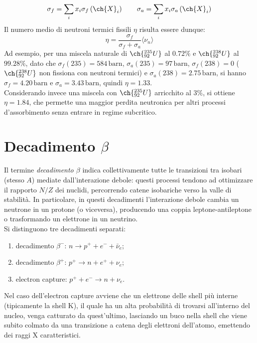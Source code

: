 \begin{equation}
	\sigma_f = \sum_{i} x_i \sigma_f\left( \ch{X}_i \right) \qquad \sigma_a = \sum_{i} x_i \sigma_a\left( \ch{X}_i \right)
	\label{eq:2.21}
\end{equation}
Il numero medio di neutroni termici fissili $ \eta $ risulta essere dunque:
\begin{equation}
	\eta = \frac{\sigma_f}{\sigma_f + \sigma_a} \langle \nu_n \rangle
	\label{eq:2.22}
\end{equation}
Ad esempio, per una miscela naturale di $ \ch{^{235}_{92} U} $ al $ 0.72\% $ e $ \ch{^{238}_{92} U} $ al $ 99.28\% $, dato che $ \sigma_f(235) = 584\,\text{barn} $, $ \sigma_a(235) = 97\,\text{barn} $, $ \sigma_f(238) = 0 $ ($ \ch{^{238}_{92} U} $ non fissiona con neutroni termici) e $ \sigma_a(238) = 2.75\,\text{barn} $, si hanno $ \sigma_f = 4.20\,\text{barn} $ e $ \sigma_{a} = 3.43\,\text{barn} $, quindi $ \eta = 1.33 $.\\
Considerando invece una miscela con $ \ch{^{235}_{92} U} $ arricchito al $ 3\% $, si ottiene $ \eta = 1.84 $, che permette una maggior perdita neutronica per altri processi d'assorbimento senza entrare in regime subcritico.

\section{Decadimento \texorpdfstring{$ \beta $}{TEXT}}

Il termine \textit{decadimento $ \beta $} indica collettivamente tutte le transizioni tra isobari (stesso $ A $) mediate dall'interazione debole: questi processi tendono ad ottimizzare il rapporto $ N/Z $ dei nuclidi, percorrendo catene isobariche verso la valle di stabilità. In particolare, in questi decadimenti l'interazione debole cambia un neutrone in un protone (o viceversa), producendo una coppia leptone-antileptone o trasformando un elettrone in un neutrino.\\
Si distinguono tre decadimenti separati:
\begin{enumerate}
	\item decadimento $ \beta^- $: $ n \rightarrow p^+ + e^- + \bar{\nu}_e $;
	\item decadimento $ \beta^+ $: $ p^+ \rightarrow n + e^+ + \nu_e $;
	\item electron capture: $ p^+ + e^- \rightarrow n + \nu_e $.
\end{enumerate}
Nel caso dell'electron capture avviene che un elettrone delle shell più interne (tipicamente la shell K), il quale ha un alta probabilità di trovarsi all'interno del nucleo, venga catturato da quest'ultimo, lasciando un buco nella shell che viene subito colmato da una transizione a catena degli elettroni dell'atomo, emettendo dei raggi X caratteristici.

